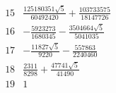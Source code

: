 \[
\begin{array}{c|l}
15&\frac{125180351 \sqrt{5}}{60492420} + \frac{103733575}{18147726}\\
16&- \frac{5923273}{1680345} - \frac{3504664 \sqrt{5}}{5041035}\\
17&- \frac{11827 \sqrt{5}}{9220} - \frac{557863}{2240460}\\
18&\frac{2311}{8298} + \frac{47741 \sqrt{5}}{41490}\\
19&1\\
\end{array}
\tag{ANP32}
\]

